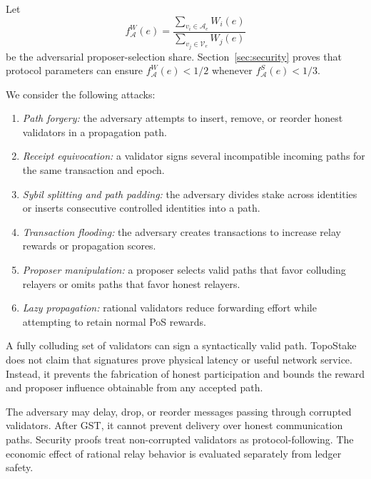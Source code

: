 \documentclass[lettersize,journal]{IEEEtran}
\begin{document}
Let
\begin{equation}
\label{eq:adversarial_proposer_fraction}
f_{\mathcal{A}}^{W}(e)
=
\frac{
\sum_{v_i\in\mathcal{A}_e}W_i(e)
}{
\sum_{v_j\in\mathcal{V}_e}W_j(e)
}
\end{equation}
be the adversarial proposer-selection share.
Section~\ref{sec:security} proves that protocol parameters can ensure
$f_{\mathcal{A}}^{W}(e)<1/2$ whenever
$f_{\mathcal{A}}^{S}(e)<1/3$.

We consider the following attacks:

\begin{enumerate}
\item \textit{Path forgery:}
the adversary attempts to insert, remove, or reorder honest validators in a propagation path.

\item \textit{Receipt equivocation:}
a validator signs several incompatible incoming paths for the same transaction and epoch.

\item \textit{Sybil splitting and path padding:}
the adversary divides stake across identities or inserts consecutive controlled identities into a path.

\item \textit{Transaction flooding:}
the adversary creates transactions to increase relay rewards or propagation scores.

\item \textit{Proposer manipulation:}
a proposer selects valid paths that favor colluding relayers or omits paths that favor honest relayers.

\item \textit{Lazy propagation:}
rational validators reduce forwarding effort while attempting to retain normal PoS rewards.
\end{enumerate}

A fully colluding set of validators can sign a syntactically valid path.
TopoStake does not claim that signatures prove physical latency or useful network service.
Instead, it prevents the fabrication of honest participation and bounds the reward and proposer influence obtainable from any accepted path.

The adversary may delay, drop, or reorder messages passing through corrupted validators.
After GST, it cannot prevent delivery over honest communication paths.
Security proofs treat non-corrupted validators as protocol-following.
The economic effect of rational relay behavior is evaluated separately from ledger safety.
\end{document}
